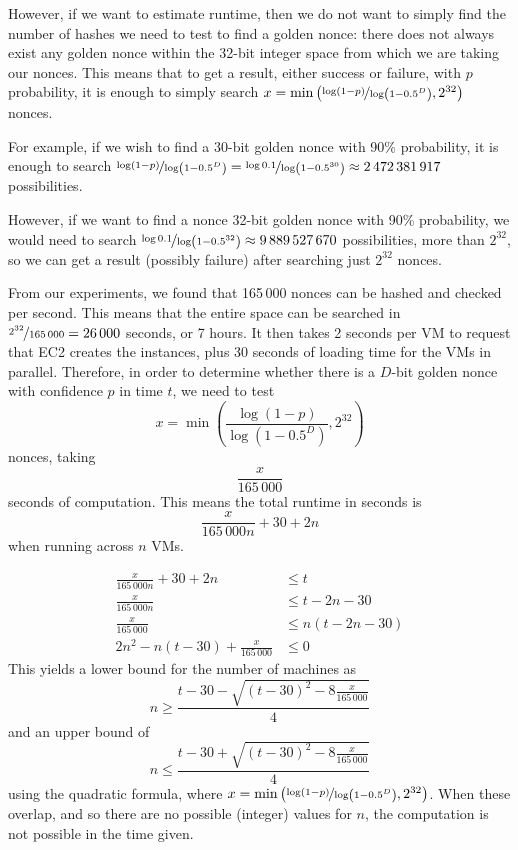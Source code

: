 \documentclass[letterpaper,twocolumn,11pt]{article}
\begin{document}
However, if we want to estimate runtime, then we do not want to simply find the number of hashes we need to test to find a golden nonce: there does not always exist any golden nonce within the 32-bit integer space from which we are taking our nonces. This means that to get a result, either success or failure, with $p$ probability, it is enough to simply search $x = \min\left(\nicefrac{\log\left(1-p\right)}{\log\left(1-0.5^D\right)}, 2^{32}\right)$ nonces.

For example, if we wish to find a 30-bit golden nonce with 90\% probability, it is enough to search $\nicefrac{\log\left(1-p\right)}{\log\left(1-0.5^D\right)} = \nicefrac{\log0.1}{\log\left(1-0.5^{30}\right)} \approx 2\,472\,381\,917$ possibilities.

However, if we want to find a nonce 32-bit golden nonce with 90\% probability, we would need to search $\nicefrac{\log0.1}{\log\left(1-0.5^{32}\right)} \approx 9\,889\,527\,670$ possibilities, more than $2^{32}$, so we can get a result (possibly failure) after searching just $2^{32}$ nonces.

From our experiments, we found that 165\,000 nonces can be hashed and checked per second. This means that the entire space can be searched in $\nicefrac{2^{32}}{165\,000} = 26\,000$ seconds, or 7 hours. It then takes 2 seconds per VM to request that EC2 creates the instances, plus 30 seconds of loading time for the VMs in parallel. Therefore, in order to determine whether there is a $D$-bit golden nonce with confidence $p$ in time $t$, we need to test $$x = \min\left(\frac{\log\left(1-p\right)}{\log\left(1-0.5^D\right)},2^{32}\right)$$ nonces, taking $$\frac{x}{165\,000}$$ seconds of computation. This means the total runtime in seconds is $$\frac{x}{165\,000n}+30+2n$$ when running across $n$ VMs.

\begin{align*}
    \frac{x}{165\,000n}+30+2n &\leq t\\
    \frac{x}{165\,000n} &\leq t-2n-30\\
    \frac{x}{165\,000} &\leq n\left(t-2n-30\right)\\
    2n^2 - n\left(t-30\right) + \frac{x}{165\,000} &\leq 0
\end{align*}
This yields a lower bound for the number of machines as $$n \geq \frac{t-30-\sqrt{\left(t-30\right)^2-8\frac{x}{165\,000}}}{4}$$ and an upper bound of $$n \leq \frac{t-30+\sqrt{\left(t-30\right)^2-8\frac{x}{165\,000}}}{4}$$ using the quadratic formula, where $x = \min\left(\nicefrac{\log\left(1-p\right)}{\log\left(1-0.5^D\right)},2^{32}\right)$. When these overlap, and so there are no possible (integer) values for $n$, the computation is not possible in the time given.
\end{document}
